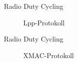 
\begin{frame}{\insertsection}{Radio Duty Cycling}
	\begin{figure}[h]
	\centering
  	\caption[Lpp-Protokoll]{Lpp-Protokoll}
	\end{figure} 
\end{frame}




\begin{frame}{\insertsection}{Radio Duty Cycling}
	\begin{figure}[h]
	\centering
  	\caption[XMAC-Protokoll]{XMAC-Protokoll}
	\end{figure} 
\end{frame}


